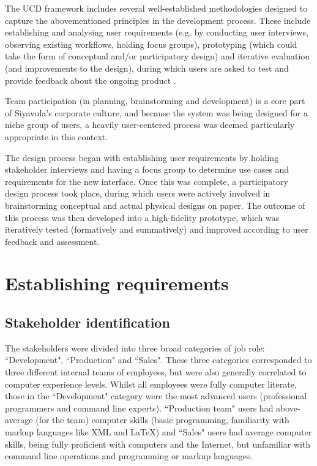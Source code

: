 The UCD framework includes several well-established methodologies designed to capture the abovementioned principles in the development process. These include establishing and analysing user requirements (e.g. by conducting user interviews, observing existing workflows, holding focus groups), prototyping (which could take the form of conceptual and/or participatory design) and iterative evaluation (and improvements to the design), during which users are asked to test and provide feedback about the ongoing product \citep[p. 330 - 331]{RogersPreece}. 

Team participation (in planning, brainstorming and development) is a core part of Siyavula's corporate culture, and because the system was being designed for a niche group of users, a heavily user-centered process was deemed particularly appropriate in this context.

The design process began with establishing user requirements by holding stakeholder interviews and having a focus group to determine use cases and requirements for the new interface. Once this was complete, a participatory design process took place, during which users were actively involved in brainstorming conceptual and actual physical designs on paper. The outcome of this process was then developed into a high-fidelity prototype, which was iteratively tested (formatively and summatively) and improved according to user feedback and assessment. 

\section{Establishing requirements}
\subsection{Stakeholder identification}
The stakeholders were divided into three broad categories of job role: ``Development", ``Production" and ``Sales". These three categories corresponded to three different internal teams of employees, but were also generally correlated to computer experience levels. Whilst all employees were fully computer literate, those in the ``Development" category were the most advanced users (professional programmers and command line experts). ``Production team" users had above-average (for the team) computer skills (basic programming, familiarity with markup languages like XML and LaTeX) and ``Sales" users had average computer skills, being fully proficient with computers and the Internet,  but unfamiliar with command line operations and programming or markup languages.

